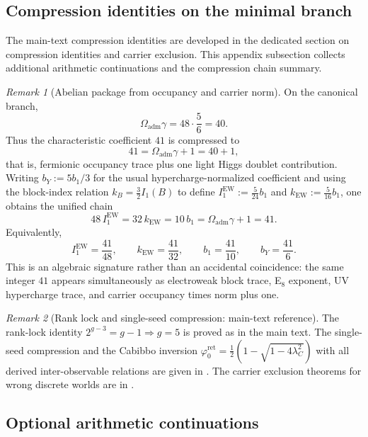 \documentclass[11pt,a4paper]{article}
\theoremstyle{definition}
\theoremstyle{remark}
\newtheorem*{remark}{Remark}
\newcommand{\phiz}{\varphi_0^{\mathrm{ret}}}
\newcommand{\bone}{b_1}
\newcommand{\Oadm}{\Omega_{\mathrm{adm}}}
\begin{document}
\subsection{Compression identities on the minimal branch}

The main-text compression identities are developed in the dedicated section on compression identities and carrier exclusion. This appendix subsection collects additional arithmetic continuations and the compression chain summary.

\begin{remark}[Abelian package from occupancy and carrier norm]
On the canonical branch,
\[
\Oadm\gamma=48\cdot\frac56=40.
\]
Thus the characteristic coefficient $41$ is compressed to
\[
41=\Oadm\gamma+1=40+1,
\]
that is, fermionic occupancy trace plus one light Higgs doublet contribution.
Writing $b_Y:=5\bone/3$ for the usual hypercharge-normalized coefficient and using the block-index relation $k_B=\frac32 I_1(B)$ to define $I_1^{\mathrm{EW}}:=\frac{5}{24}\bone$ and $k_{\mathrm{EW}}:=\frac{5}{16}\bone$, one obtains the unified chain
\begin{equation}
\label{eq:41-chain}
48\,I_1^{\mathrm{EW}}
=32\,k_{\mathrm{EW}}
=10\,\bone
=\Oadm\gamma+1
=41.
\end{equation}
Equivalently,
\[
I_1^{\mathrm{EW}}=\frac{41}{48},
\qquad
k_{\mathrm{EW}}=\frac{41}{32},
\qquad
\bone=\frac{41}{10},
\qquad
b_Y=\frac{41}{6}.
\]
This is an algebraic signature rather than an accidental coincidence: the same integer $41$ appears simultaneously as electroweak block trace, E$_8$ exponent, UV hypercharge trace, and carrier occupancy times norm plus one.
\end{remark}

\begin{remark}[Rank lock and single-seed compression: main-text reference]
The rank-lock identity $2^{g-3}=g-1\Rightarrow g=5$ is proved as  in the main text.
The single-seed compression and the Cabibbo inversion $\phiz=\frac12(1-\sqrt{1-4\lambda_C^2})$ with all derived inter-observable relations are given in . The carrier exclusion theorems for wrong discrete worlds are in .
\end{remark}

\subsection{Optional arithmetic continuations}
\end{document}
